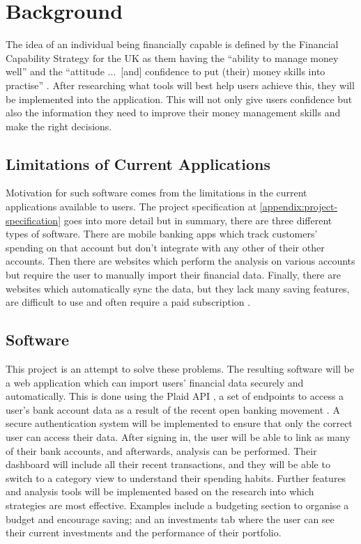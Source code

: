 \section{Background}
\label{sec:background}

The idea of an individual being financially capable is defined by the Financial Capability Strategy for the UK as them having the ``ability to manage money well'' and the ``attitude ...\ [and] confidence to put (their) money skills into practise'' \cite{FinancialCapabilityUK}. After researching what tools will best help users achieve this, they will be implemented into the application. This will not only give users confidence but also the information they need to improve their money management skills and make the right decisions.


\subsection{Limitations of Current Applications}
Motivation for such software comes from the limitations in the current applications available to users. The project specification at \ref*{appendix:project-specification} goes into more detail but in summary, there are three different types of software. There are mobile banking apps which track customers' spending on that account but don't integrate with any other of their other accounts. Then there are websites which perform the analysis on various accounts but require the user to manually import their financial data. Finally, there are websites which automatically sync the data, but they lack many saving features, are difficult to use and often require a paid subscription \cite{PersonalFinanceAppsComparison}.

\subsection{Software}
This project is an attempt to solve these problems. The resulting software will be a web application which can import users' financial data securely and automatically. This is done using the Plaid API \cite{Plaid}, a set of endpoints to access a user's bank account data as a result of the recent open banking movement \cite{OpenBanking}. A secure authentication system will be implemented to ensure that only the correct user can access their data. After signing in, the user will be able to link as many of their bank accounts, and afterwards, analysis can be performed. Their dashboard will include all their recent transactions, and they will be able to switch to a category view to understand their spending habits. Further features and analysis tools will be implemented based on the research into which strategies are most effective. Examples include a budgeting section to organise a budget and encourage saving; and an investments tab where the user can see their current investments and the performance of their portfolio.


